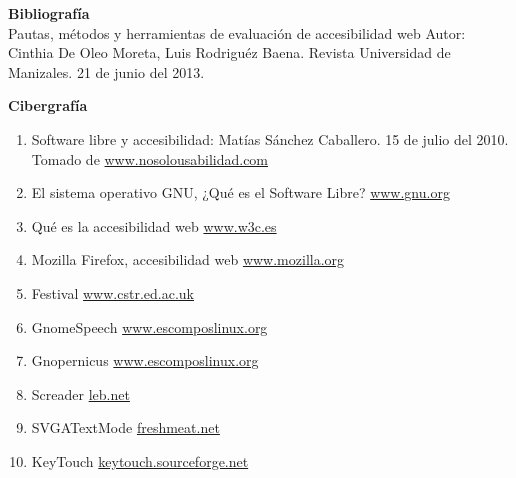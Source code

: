 \begin{multicols}{2}
\medskip


\begin{bibliografia}
\textbf{Bibliografía}\\

Pautas, métodos y herramientas de evaluación de accesibilidad web Autor: Cinthia De Oleo Moreta, Luis Rodriguéz Baena. Revista Universidad de Manizales. 21 de junio del 2013.

\end{bibliografia}

\textbf{Cibergrafía}

\begin{enumerate}

\item Software libre y accesibilidad: Matías Sánchez Caballero. 15 de julio del 2010. Tomado de \href{http://www.nosolousabilidad.com/articulos/software_libre.htm?utm_source=feedburner}{www.nosolousabilidad.com}

\item El sistema operativo GNU, ¿Qué es el Software Libre? \href{https://www.gnu.org/philosophy/free-sw.es.html}{www.gnu.org}

\item Qué es la accesibilidad web \href{http://www.w3c.es/Traducciones/es/WAI/intro/accessibility}{www.w3c.es}

\item Mozilla Firefox, accesibilidad web \href{http://www.mozilla.org/access}{www.mozilla.org}

\item Festival \href{http://www.cstr.ed.ac.uk/projects/festival/}{www.cstr.ed.ac.uk}

\item GnomeSpeech \href{http://www.escomposlinux.org/lfs-es/blfs-es-SVN/gnome/gnome-speech.html}{www.escomposlinux.org}

\item Gnopernicus \href{http://www.escomposlinux.org/lfs-es/blfs-es-6.0/gnome/gnopernicus.html}{www.escomposlinux.org}

\item Screader \href{http://leb.net/pub/blinux/screader/}{leb.net}

\item SVGATextMode \href{http://freshmeat.net/projects/svgatextmode/}{freshmeat.net}

\item KeyTouch \href{http://keytouch.sourceforge.net}{keytouch.sourceforge.net}


\end{enumerate}
\end{multicols}
